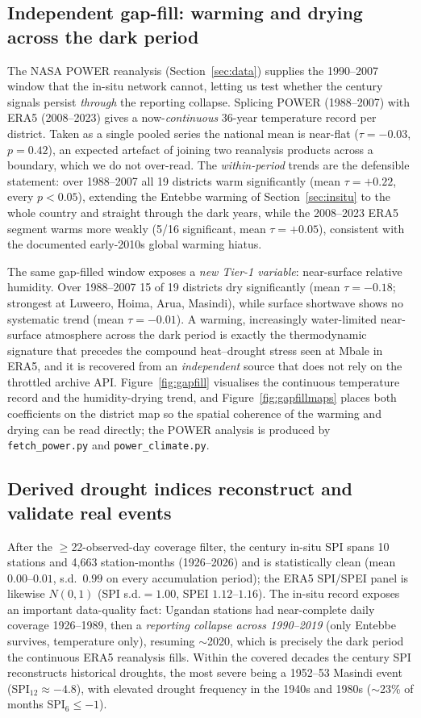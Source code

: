 \documentclass[preprint,12pt]{elsarticle}
\begin{document}
\subsection{Independent gap-fill: warming and drying across the dark period}
\label{sec:powerres}
The NASA POWER reanalysis (Section~\ref{sec:data}) supplies the
1990--2007 window that the in-situ network cannot, letting us test whether the
century signals persist \emph{through} the reporting collapse. Splicing POWER
(1988--2007) with ERA5 (2008--2023) gives a now-\emph{continuous} 36-year
temperature record per district. Taken as a single pooled series the national
mean is near-flat ($\tau=-0.03$, $p=0.42$), an expected artefact of joining
two reanalysis products across a boundary, which we do not over-read. The
\emph{within-period} trends are the defensible statement: over 1988--2007
all 19 districts warm significantly (mean $\tau=+0.22$, every
$p<0.05$), extending the Entebbe warming of Section~\ref{sec:insitu} to the
whole country and straight through the dark years, while the 2008--2023 ERA5
segment warms more weakly (5/16 significant, mean $\tau=+0.05$), consistent
with the documented early-2010s global warming hiatus.

The same gap-filled window exposes a \emph{new Tier-1 variable}: near-surface
relative humidity. Over 1988--2007 15 of 19 districts dry significantly
(mean $\tau=-0.18$; strongest at Luweero, Hoima, Arua, Masindi), while surface
shortwave shows no systematic trend (mean $\tau=-0.01$). A warming, increasingly
water-limited near-surface atmosphere across the dark period is exactly the
thermodynamic signature that precedes the compound heat--drought stress seen at
Mbale in ERA5, and it is recovered from an \emph{independent}
source that does not rely on the throttled archive API. Figure~\ref{fig:gapfill}
visualises the continuous temperature record and the humidity-drying trend, and
Figure~\ref{fig:gapfillmaps} places both coefficients on the district map so the
spatial coherence of the warming and drying can be read directly; the POWER
analysis is produced by \texttt{fetch\_power.py} and
\texttt{power\_climate.py}.

\subsection{Derived drought indices reconstruct and validate real events}
\label{sec:droughtres}
After the $\geq$22-observed-day coverage filter, the century in-situ SPI spans
10 stations and 4{,}663 station-months (1926--2026) and is statistically clean
(mean $0.00$--$0.01$, s.d.\ $0.99$ on every accumulation period); the ERA5
SPI/SPEI panel is likewise $N(0,1)$ (SPI s.d.$=1.00$, SPEI $1.12$--$1.16$).
The in-situ record exposes an important data-quality fact: Ugandan stations had
near-complete daily coverage 1926--1989, then a \emph{reporting collapse across
1990--2019} (only Entebbe survives, temperature only), resuming $\sim$2020, which is
precisely the dark period the continuous ERA5 reanalysis fills. Within the
covered decades the century SPI reconstructs historical droughts, the most
severe being a 1952--53 Masindi event (SPI$_{12}\approx-4.8$), with elevated
drought frequency in the 1940s and 1980s ($\sim$23\% of months SPI$_6\leq-1$).
\end{document}
